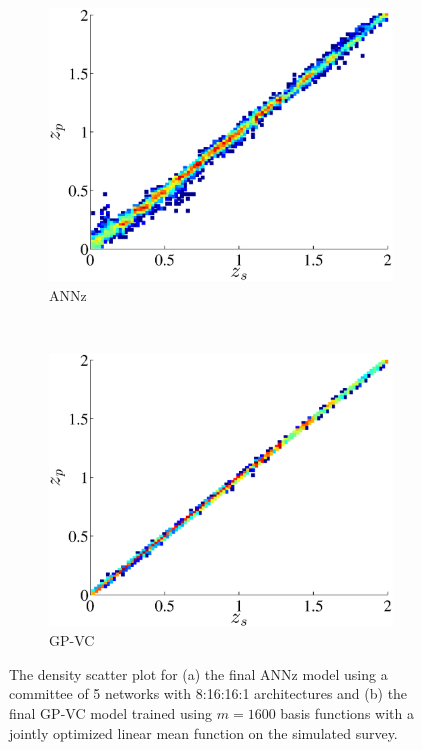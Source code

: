 \documentclass[useAMS,usenatbib,fleqn]{mn2e}
\begin{document}
\begin{figure}
        \centering
       
       \begin{subfigure}[b]{\columnwidth}
                \includegraphics[width=\columnwidth]{figures/ANN_final_euclid}
        \caption{{\sc ANNz}}
        \end{subfigure}
        ~ 
        \begin{subfigure}[b]{\columnwidth}
                \includegraphics[width=\columnwidth]{figures/GPVC_final_euclid}
        \caption{GP-VC}
        \end{subfigure}

       \caption{The density scatter plot for (a) the final {\sc ANNz} model using a committee of 5 networks with 8:16:16:1 architectures and (b) the final GP-VC model trained using $m=1600$ basis functions with a jointly optimized linear mean function on the simulated survey. }
       \label{fig-final-model}
\end{figure}
\end{document}
